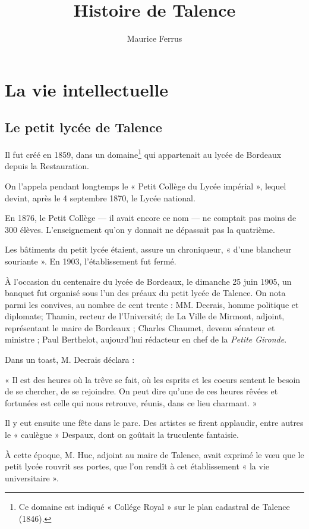 \documentclass[a4paper,11pt]{book}
\begin{document}
\title{Histoire de Talence}
\author{Maurice Ferrus}
\frontmatter
\maketitle

\mainmatter{}

\chapter{La vie intellectuelle}
\section{Le petit lycée de Talence}

Il fut créé en 1859, dans un domaine\footnote{Ce domaine est indiqué « Collége Royal » sur le plan cadastral de Talence (1846).} qui appartenait au lycée de Bordeaux depuis la Restauration. 

On l'appela pendant longtemps le « Petit Collège du Lycée impérial », lequel devint, après le 4 septembre 1870, le Lycée national.

En 1876, le Petit Collège — il avait encore ce nom — ne comptait pas moins de 300 élèves. L'enseignement qu'on y donnait ne dépassait pas la quatrième. 

Les bâtiments du petit lycée étaient, assure un chroniqueur, « d'une blancheur souriante ». En 1903, l'établissement fut fermé.

À l'occasion du centenaire du lycée de Bordeaux, le dimanche 25 juin 1905, un banquet fut organisé sous l'un des préaux du petit lycée de Talence. On nota parmi les convives, au nombre de cent trente : MM. Decrais, homme politique et diplomate; Thamin, recteur de l'Université; de La Ville de Mirmont, adjoint, représentant le maire de Bordeaux ; Charles Chaumet, devenu sénateur et ministre ; Paul Berthelot, aujourd'hui rédacteur en chef de la \textit{Petite Gironde}.

Dans un toast, M. Decrais déclara :

« Il est des heures où la trêve se fait, où les esprits et les coeurs sentent le besoin de se chercher, de se rejoindre. On peut dire qu'une de ces heures rêvées et fortunées est celle qui nous retrouve, réunis, dans ce lieu charmant. »

Il y eut ensuite une fête dans le parc. Des artistes se firent applaudir, entre autres le « caulègue » Despaux, dont on goûtait la truculente fantaisie.

À cette époque, M. Huc, adjoint au maire de Talence, avait exprimé le vœu que le petit lycée rouvrit ses portes, que l'on rendît à cet établissement « la vie universitaire ».
\end{document}

